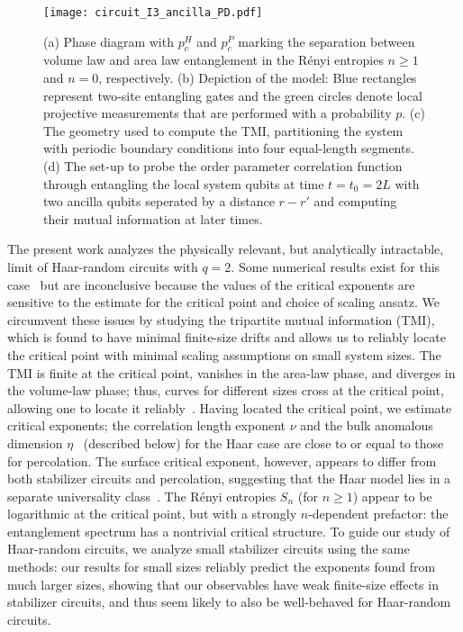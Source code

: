 \documentclass[prl,twocolumn,aps,showpacs,amsmath,amssymb,superscriptaddress,floatfix,longbibliography]{revtex4-1}
\begin{document}
\begin{figure}[tb]
\centering
           \texttt{[image: circuit\_I3\_ancilla\_PD.pdf]}
   \caption{(a) Phase diagram with $p_c^H$ and $p_c^P$ marking the separation between volume law and area law entanglement in the R\'enyi entropies $n \ge 1$ and $n=0$, respectively. (b) Depiction of the model:   Blue rectangles represent two-site entangling gates and the green circles denote local projective measurements that are performed with a probability $p$. (c) The geometry used to compute the TMI, partitioning the system with periodic boundary conditions into four equal-length segments. (d) The set-up to probe the order parameter correlation function through entangling the local system qubits at time $t=t_0=2L$ with two ancilla qubits seperated by a distance $r-r'$ and computing their mutual information at later times.}
  \label{fig:model}
\end{figure}

The present work analyzes the physically relevant, but analytically intractable, limit of Haar-random circuits with $q = 2$. Some numerical results exist for this case~\cite{Skinner2019,BaoChoiAltman2019,LCF2019} but are inconclusive because the values of the critical exponents are sensitive to the estimate for the critical point and choice of scaling ansatz. We circumvent these issues by studying the tripartite mutual information (TMI), which is found to have minimal finite-size drifts and allows us to reliably locate the critical point with minimal scaling assumptions on small system sizes.  The TMI is finite at the critical point, vanishes in the area-law phase, and diverges in the volume-law phase; thus, curves for different sizes cross at the critical point, allowing one to locate it reliably~\cite{Gullans2019, Kitaev2006, LevinWen2006}.  Having located the critical point, we estimate critical exponents; the correlation length exponent $\nu$ and the bulk anomalous dimension $\eta$~\cite{Gullans2019b} (described below) for the Haar case are close to or equal to those for percolation.  The surface critical exponent, however, appears to differ from both stabilizer circuits and percolation, suggesting that the Haar model lies in a separate universality class~\cite{Cardy84}.  The R\'enyi entropies $S_n$ (for $n \geq 1$) appear to be logarithmic at the critical point, but with a strongly $n$-dependent prefactor: the entanglement spectrum has a nontrivial critical structure. To guide our study of Haar-random circuits, we analyze small stabilizer circuits using the same methods: our results for small sizes reliably predict the exponents found from much larger sizes, showing that our observables have weak finite-size effects in stabilizer circuits, and thus seem likely to also be well-behaved for Haar-random circuits.
\end{document}
